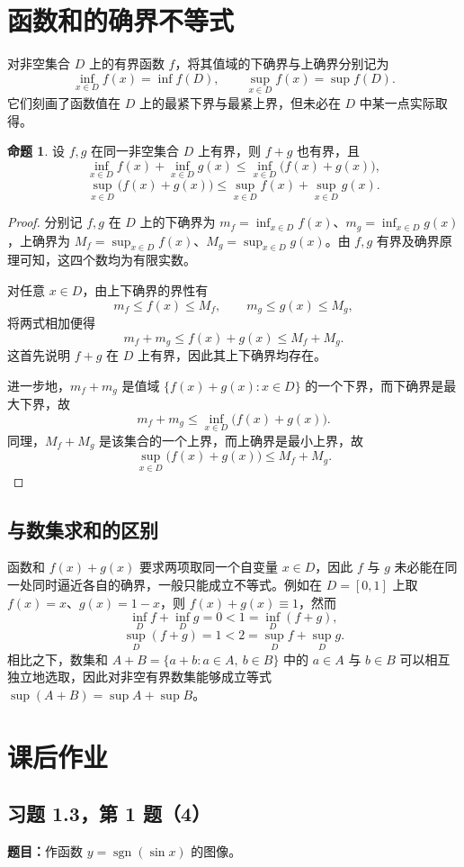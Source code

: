\documentclass[UTF8, fontset=fandol, a4paper, 12pt]{ctexart}
\DeclareMathOperator{\sgn}{sgn}
\theoremstyle{definition}
\newtheorem{proposition}[definition]{命题}
\begin{document}
\section{函数和的确界不等式}
对非空集合 $D$ 上的有界函数 $f$，将其值域的下确界与上确界分别记为
\[
 \inf_{x\in D}f(x)=\inf f(D),\qquad
 \sup_{x\in D}f(x)=\sup f(D).
\]
它们刻画了函数值在 $D$ 上的最紧下界与最紧上界，但未必在 $D$ 中某一点实际取得。

\begin{proposition}
设 $f,g$ 在同一非空集合 $D$ 上有界，则 $f+g$ 也有界，且
\[
 \inf_{x\in D}f(x)+\inf_{x\in D}g(x)
 \le\inf_{x\in D}\bigl(f(x)+g(x)\bigr),
\]
\[
 \sup_{x\in D}\bigl(f(x)+g(x)\bigr)
 \le\sup_{x\in D}f(x)+\sup_{x\in D}g(x).
\]
\end{proposition}
\begin{proof}
分别记 $f,g$ 在 $D$ 上的下确界为 $m_f=\inf_{x\in D}f(x)$、$m_g=\inf_{x\in D}g(x)$，上确界为 $M_f=\sup_{x\in D}f(x)$、$M_g=\sup_{x\in D}g(x)$。由 $f,g$ 有界及确界原理可知，这四个数均为有限实数。

对任意 $x\in D$，由上下确界的界性有
\[
 m_f\le f(x)\le M_f,\qquad m_g\le g(x)\le M_g,
\]
将两式相加便得
\[
 m_f+m_g\le f(x)+g(x)\le M_f+M_g.
\]
这首先说明 $f+g$ 在 $D$ 上有界，因此其上下确界均存在。

进一步地，$m_f+m_g$ 是值域 $\{f(x)+g(x):x\in D\}$ 的一个下界，而下确界是最大下界，故
\[
 m_f+m_g\le\inf_{x\in D}\bigl(f(x)+g(x)\bigr).
\]
同理，$M_f+M_g$ 是该集合的一个上界，而上确界是最小上界，故
\[
 \sup_{x\in D}\bigl(f(x)+g(x)\bigr)\le M_f+M_g.
\]
\end{proof}

\subsection*{与数集求和的区别}
函数和 $f(x)+g(x)$ 要求两项取同一个自变量 $x\in D$，因此 $f$ 与 $g$ 未必能在同一处同时逼近各自的确界，一般只能成立不等式。例如在 $D=[0,1]$ 上取 $f(x)=x$、$g(x)=1-x$，则 $f(x)+g(x)\equiv1$，然而
\[
 \inf_D f+\inf_D g=0<1=\inf_D(f+g),
\]
\[
 \sup_D(f+g)=1<2=\sup_D f+\sup_D g.
\]
相比之下，数集和 $A+B=\{a+b:a\in A,\ b\in B\}$ 中的 $a\in A$ 与 $b\in B$ 可以相互独立地选取，因此对非空有界数集能够成立等式 $\sup(A+B)=\sup A+\sup B$。

\section{课后作业}

\subsection{习题 1.3，第 1 题（4）}
\noindent\textbf{题目：}作函数 $y=\sgn(\sin x)$ 的图像。
\end{document}
